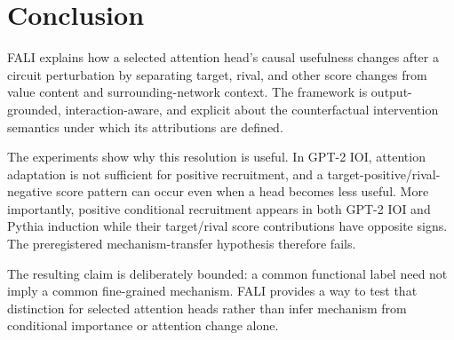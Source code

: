 \section{Conclusion}\label{sec:conclusion}

FALI explains how a selected attention head's causal usefulness changes after a circuit perturbation by separating target, rival, and other score changes from value content and surrounding-network context. The framework is output-grounded, interaction-aware, and explicit about the counterfactual intervention semantics under which its attributions are defined.

The experiments show why this resolution is useful. In GPT-2 IOI, attention adaptation is not sufficient for positive recruitment, and a target-positive/rival-negative score pattern can occur even when a head becomes less useful. More importantly, positive conditional recruitment appears in both GPT-2 IOI and Pythia induction while their target/rival score contributions have opposite signs. The preregistered mechanism-transfer hypothesis therefore fails.

The resulting claim is deliberately bounded: a common functional label need not imply a common fine-grained mechanism. FALI provides a way to test that distinction for selected attention heads rather than infer mechanism from conditional importance or attention change alone.
